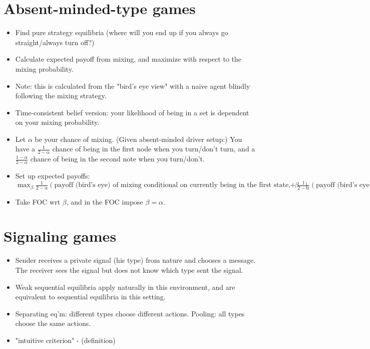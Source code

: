 \documentclass[11pt]{article} %
\begin{document}
\section{Absent-minded-type games}
\begin{itemize}
\item Find pure strategy equilibria (where will you end up if you always go straight/always turn off?)
\item Calculate expected payoff from mixing, and maximize with respect to the mixing probability.
\item Note: this is calculated from the "bird's eye view" with a naive agent blindly following the mixing strategy.
\item Time-consistent belief version: your likelihood of being in a set is dependent on your mixing probability.
\item Let $\alpha$ be your chance of mixing. (Given absent-minded driver setup:) You have a $\frac{1}{2-\alpha}$ chance of being in the first node when you turn/don't turn, and a $\frac{1-\alpha}{2-\alpha}$ chance of being in the second note when you turn/don't.
\item Set up expected payoffs: $\max_{\beta} \frac{1}{2-\alpha}(\text{payoff (bird's eye) of mixing conditional on currently being in the first state, w/ turning probability $\beta$ } ) + \frac{1}{2-\alpha}(\text{payoff (bird's eye) of mixing conditional on currently being in the second state, w/ turning probability $\beta$ }) $
\item Take FOC wrt $\beta$, and in the FOC impose $\beta = \alpha.$
\end{itemize}

\section{Signaling games}
\begin{itemize}
\item Sender receives a private signal (his type) from nature and chooses a message. The receiver sees the signal but does not know which type sent the signal.
\item Weak sequential equilibria apply naturally in this environment, and are equivalent to sequential equilibria in this setting.
\item Separating eq'm: different types choose different actions. Pooling: all types choose the same actions.
\item "intuitive criterion" - (definition)
\end{itemize}
\end{document}

